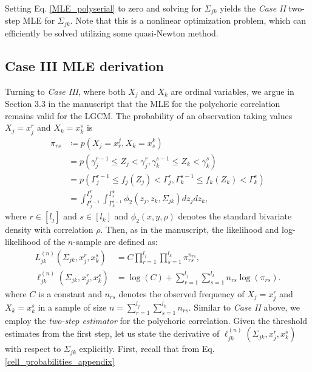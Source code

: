 Setting Eq. \eqref{MLE_polyserial} to zero and solving for $\Sigma_{jk}$ yields the \textit{Case II} two-step MLE for $\Sigma_{jk}$. Note that this is a nonlinear optimization problem, which can efficiently be solved utilizing some quasi-Newton method.


\subsection{Case III MLE derivation}

Turning to \textit{Case III}, where both $X_j$ and $X_k$ are ordinal variables, we argue in Section 3.3 in the manuscript that the MLE for the polychoric correlation remains valid for the LGCM. The probability of an observation taking values $X_j = x^r_j$ and $X_k = x^s_k$ is
\begin{equation}\label{cell_probabilities_appendix}
    \begin{split}
        \pi_{rs} &\coloneqq p(X_j = x_r^j, X_k = x_s^k) \\
        &= p(\gamma_j^{r-1} \leq Z_j < \gamma_j^r, \gamma_k^{s-1} \leq Z_k < \gamma_k^s) \\
        &= p(\Gamma_j^{r-1} \leq f_j(Z_j) < \Gamma_j^r, \Gamma_k^{s-1} \leq f_k(Z_k) < \Gamma_k^s) \\
        &= \int_{\Gamma_j^{r-1}}^{\Gamma_j^{r}} \int_{\Gamma_k^{s-1}}^{\Gamma^k_{s}} \phi_2(z_j,z_k,\Sigma_{jk}) dz_j dz_k,
    \end{split}
\end{equation}
where $r \in [l_j]$ and $s \in [l_k]$ and $\phi_2(x,y,\rho)$ denotes the standard bivariate density with correlation $\rho$. Then, as in the manuscript, the likelihood and log-likelihood of the $n$-sample are defined as:
\begin{equation}\label{polychoric_likelihood_appendix}
    \begin{split}
        L_{jk}^{(n)}(\Sigma_{jk}, x_j^r,x_k^s) &= C \prod_{r=1}^{l_{{j}}} \prod_{s=1}^{l_{{k}}} \pi_{rs}^{n_{rs}}, \\
        \ell_{jk}^{(n)}(\Sigma_{jk}, x_j^r,x_k^s) &= \log(C) + \sum_{r=1}^{l_{{j}}}\sum_{s=1}^{l_{{k}}} n_{rs} \log(\pi_{rs}).
    \end{split}
\end{equation}
where $C$ is a constant and $n_{rs}$ denotes the observed frequency of $X_j = x^r_j$ and $X_k = x^s_k$ in a sample of size $n= \sum_{r=1}^{l_{{j}}}\sum_{s=1}^{l_{{k}}} n_{rs}$.
Similar to \textit{Case II} above, we employ the \textit{two-step estimator} for the polychoric correlation. Given the threshold estimates from the first step, let us state the derivative of $\ell_{jk}^{(n)}(\Sigma_{jk}, x_j^r,x_k^s)$ with respect to $\Sigma_{jk}$ explicitly. First, recall that from Eq. \eqref{cell_probabilities_appendix}
